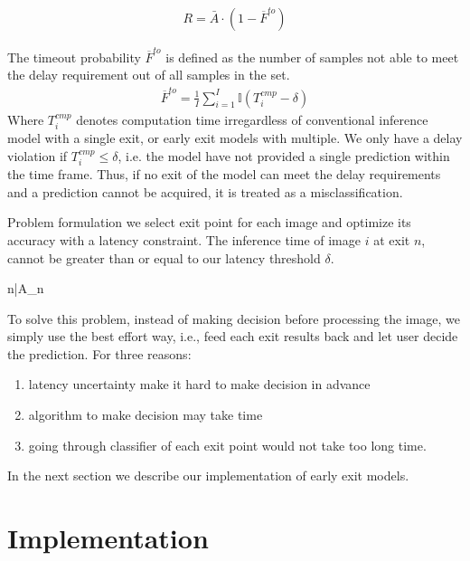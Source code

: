 \begin{enumdescript}
	\begin{align}
	R= \bar{A} \cdot (1-\overline{F}^{to})
	\end{align}
	
	The timeout probability $ \overline{F}^{to} $ is defined as the number of samples not able to meet the delay requirement out of all samples in the set.
	\begin{align}
	\overline{F}^{to}=\frac{1}{I}\sum_{i=1}^{I} \mathbb{I}\left(T_{i}^{cmp}-\delta\right)
	\end{align}
	Where $ T_{i}^{cmp} $ denotes computation time irregardless of conventional inference model with a single exit, or early exit models with multiple. We only have a delay violation if $ T_i^{cmp} \leq \delta $, i.e. the model have not provided a single prediction within the time frame. Thus, if no exit of the model can meet the delay requirements and a prediction cannot be acquired, it is treated as a misclassification. 
		
	\item[Problem formulation] we select exit point for each image and optimize its accuracy with a latency constraint. The inference time of image $ i $ at exit $ n $, cannot be greater than or equal to our latency threshold $ \delta $. 
	
	\begin{maxi}
		{n}{\bar{A}_{n}}
		{}{}
	\end{maxi}
	
	To solve this problem, instead of making decision before processing the image, we simply use the best effort way, i.e., feed each exit results back and let user decide the prediction. For three reasons:
	\begin{enumerate}
		\item latency uncertainty make it hard to make decision in advance
		\item algorithm to make decision may take time
		\item going through classifier of each exit point would not take too long time.
	\end{enumerate}
		
	\end{enumdescript}


In the next section we describe our implementation of early exit models.

\section{Implementation} \label{sec:ee-implementation}

